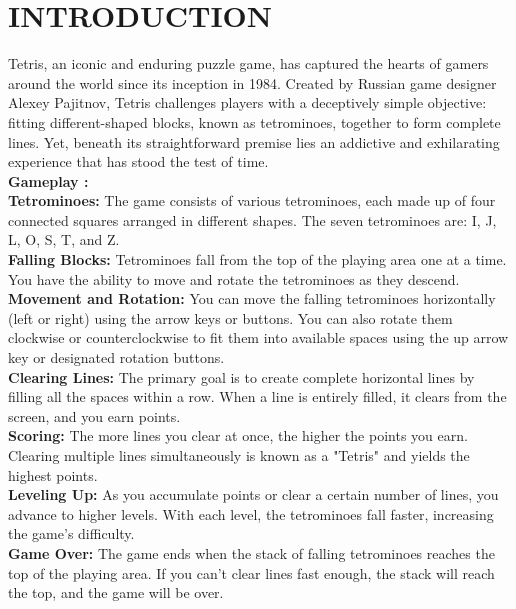 \newpage
\section{INTRODUCTION}
\hspace{5mm}Tetris, an iconic and enduring puzzle game, has captured the hearts of gamers around the world since its inception in 1984. Created by Russian game designer Alexey Pajitnov, Tetris challenges players with a deceptively simple objective: fitting different-shaped blocks, known as tetrominoes, together to form complete lines. Yet, beneath its straightforward premise lies an addictive and exhilarating experience that has stood the test of time.\\

\textbf{Gameplay :} \\

\textbf{Tetrominoes:} The game consists of various tetrominoes, each made up of four connected squares arranged in different shapes. The seven tetrominoes are: I, J, L, O, S, T, and Z.\\

\textbf{Falling Blocks: }Tetrominoes fall from the top of the playing area one at a time. You have the ability to move and rotate the tetrominoes as they descend.\\

\textbf{Movement and Rotation:} You can move the falling tetrominoes horizontally (left or right) using the arrow keys or buttons. You can also rotate them clockwise or counterclockwise to fit them into available spaces using the up arrow key or designated rotation buttons.\\

\textbf{Clearing Lines:} The primary goal is to create complete horizontal lines by filling all the spaces within a row. When a line is entirely filled, it clears from the screen, and you earn points.\\

\textbf{Scoring:} The more lines you clear at once, the higher the points you earn. Clearing multiple lines simultaneously is known as a "Tetris" and yields the highest points.\\

\textbf{Leveling Up:} As you accumulate points or clear a certain number of lines, you advance to higher levels. With each level, the tetrominoes fall faster, increasing the game's difficulty.\\

\textbf{Game Over:} The game ends when the stack of falling tetrominoes reaches the top of the playing area. If you can't clear lines fast enough, the stack will reach the top, and the game will be over.\\

